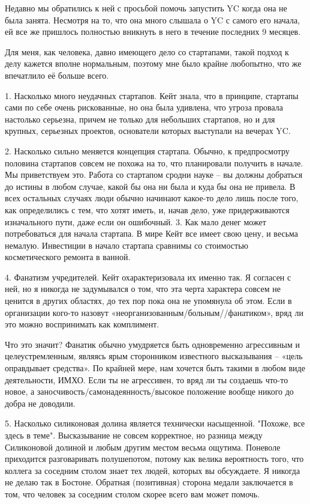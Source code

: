 \documentclass[ebook,12pt,oneside,openany]{memoir}
\author{Пол Грэм} \date{}
\begin{document}
\maketitle

Недавно мы обратились к ней с просьбой помочь запустить YC когда она
не была занята. Несмотря на то, что она много слышала о YC с самого
его начала, ей все же пришлось полностью вникнуть в него в течение
последних 9 месяцев.

Для меня, как человека, давно имеющего дело со стартапами, такой
подход к делу кажется вполне нормальным, поэтому мне было крайне
любопытно, что же впечатлило её больше всего.

1. Насколько много неудачных стартапов. Кейт знала, что в принципе,
стартапы сами по себе очень рискованные, но она была удивлена, что
угроза провала настолько серьезна, причем не только для небольших
стартапов, но и для крупных, серьезных проектов, основатели которых
выступали на вечерах YC.


2. Насколько сильно меняется концепция стартапа. Обычно, к
предпросмотру половина стартапов совсем не похожа на то, что
планировали получить в начале. Мы приветствуем это. Работа со
стартапом сродни науке – вы должны добраться до истины в любом случае,
какой бы она ни была и куда бы она не привела. В всех остальных
случаях люди обычно начинают какое-то дело лишь после того, как
определились с тем, что хотят иметь, и, начав дело, уже придерживаются
изначального пути, даже если он ошибочный. 3. Как мало денег может
потребоваться для начала стартапа. В мире Кейт все имеет свою цену, и
весьма немалую. Инвестиции в начало стартапа сравнимы со стоимостью
косметического ремонта в ванной.


4. Фанатизм учредителей. Кейт охарактеризовала их именно так. Я
согласен с ней, но я никогда не задумывался о том, что эта черта
характера совсем не ценится в других областях, до тех пор пока она не
упомянула об этом. Если в организации кого-то назовут
«неорганизованным/больным//фанатиком», вряд ли это можно воспринимать
как комплимент.

Что это значит? Фанатик обычно умудряется быть одновременно
агрессивным и целеустремленным, являясь ярым сторонником известного
высказывания – «цель оправдывает средства». По крайней мере, нам
хочется быть такими в любом виде деятельности, ИМХО. Если ты не
агрессивен, то вряд ли ты создаешь что-то новое, а
заносчивость/самонадеянность/высокое положение вообще никого до добра
не доводили.


5. Насколько силиконовая долина является технически насыщенной.
"Похоже, все здесь в теме". Высказывание не совсем корректное, но
разница между Силиконовой долиной и любым другим местом весьма
ощутима. Поневоле приходится разговаривать полушепотом, потому как
велика вероятность того, что коллега за соседним столом знает тех
людей, которых вы обсуждаете. Я никогда не делаю так в Бостоне.
Обратная (позитивная) сторона медали заключается в том, что человек за
соседним столом скорее всего вам может помочь.
\end{document}
